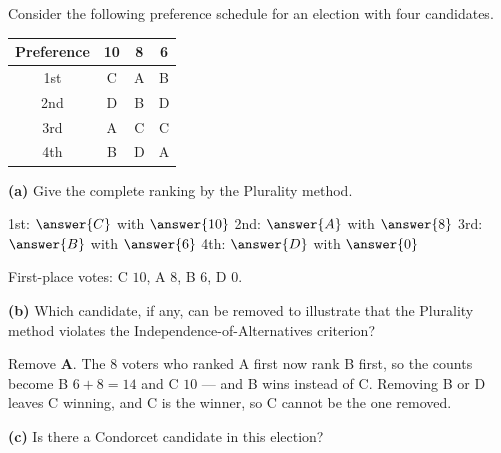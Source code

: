 \documentclass[12pt]{ximera}
\begin{document}
\begin{problem}
Consider the following preference schedule for an election with four candidates.

\begin{center}
\begin{tabular}{c|ccc}
Preference & 10 & 8 & 6 \\\hline
1st & C & A & B \\
2nd & D & B & D \\
3rd & A & C & C \\
4th & B & D & A
\end{tabular}
\end{center}

\begin{prompt}
\textbf{(a)} Give the complete ranking by the Plurality method.

1st: $\answer{C}$ with $\answer{10}$ \quad 2nd: $\answer{A}$ with $\answer{8}$ \quad
3rd: $\answer{B}$ with $\answer{6}$ \quad 4th: $\answer{D}$ with $\answer{0}$

\begin{feedback}
First-place votes: C $10$, A $8$, B $6$, D $0$.
\end{feedback}
\end{prompt}

\begin{prompt}
\textbf{(b)} Which candidate, if any, can be removed to illustrate that the Plurality
method violates the Independence-of-Alternatives criterion?

\begin{multipleChoice}
\end{multipleChoice}

\begin{feedback}
Remove \textbf{A}. The $8$ voters who ranked A first now rank B first, so the counts
become B $6+8=14$ and C $10$ --- and B wins instead of C. Removing B or D leaves C
winning, and C is the winner, so C cannot be the one removed.
\end{feedback}
\end{prompt}

\begin{prompt}
\textbf{(c)} Is there a Condorcet candidate in this election?

\begin{multipleChoice}
\end{multipleChoice}


\end{prompt}
\end{problem}
\end{document}
